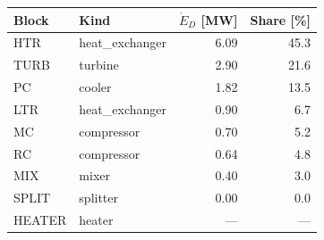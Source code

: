 \begin{tabular}{@{}llrr@{}}
\toprule
Block & Kind & $\dot E_D$ [\si{\mega\watt}] & Share [\si{\percent}] \\
\midrule
HTR & heat\_exchanger & 6.09 & 45.3 \\
TURB & turbine & 2.90 & 21.6 \\
PC & cooler & 1.82 & 13.5 \\
LTR & heat\_exchanger & 0.90 & 6.7 \\
MC & compressor & 0.70 & 5.2 \\
RC & compressor & 0.64 & 4.8 \\
MIX & mixer & 0.40 & 3.0 \\
SPLIT & splitter & 0.00 & 0.0 \\
HEATER & heater & --- & --- \\
\bottomrule
\end{tabular}
